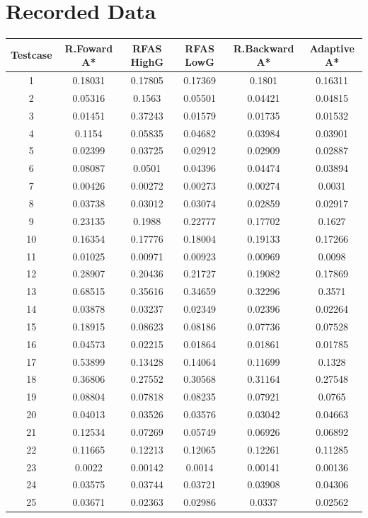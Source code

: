 \documentclass[12pt]{article}
\begin{document}
	\section*{Recorded Data}
		\begin{table}[!htb]
			\centering
			\begin{tabular}{|c|c|c|c|c|c|}
				Testcase & R.Foward A* &  RFAS HighG & RFAS LowG & R.Backward A* & Adaptive A*\\\hline
				1&0.18031&0.17805&0.17369&0.1801&0.16311\\
				2&0.05316&0.1563&0.05501&0.04421&0.04815\\
				3&0.01451&0.37243&0.01579&0.01735&0.01532\\
				4&0.1154&0.05835&0.04682&0.03984&0.03901\\
				5&0.02399&0.03725&0.02912&0.02909&0.02887\\
				6&0.08087&0.0501&0.04396&0.04474&0.03894\\
				7&0.00426&0.00272&0.00273&0.00274&0.0031\\
				8&0.03738&0.03012&0.03074&0.02859&0.02917\\
				9&0.23135&0.1988&0.22777&0.17702&0.1627\\
				10&0.16354&0.17776&0.18004&0.19133&0.17266\\
				11&0.01025&0.00971&0.00923&0.00969&0.0098\\
				12&0.28907&0.20436&0.21727&0.19082&0.17869\\
				13&0.68515&0.35616&0.34659&0.32296&0.3571\\
				14&0.03878&0.03237&0.02349&0.02396&0.02264\\
				15&0.18915&0.08623&0.08186&0.07736&0.07528\\
				16&0.04573&0.02215&0.01864&0.01861&0.01785\\
				17&0.53899&0.13428&0.14064&0.11699&0.1328\\
				18&0.36806&0.27552&0.30568&0.31164&0.27548\\
				19&0.08804&0.07818&0.08235&0.07921&0.0765\\
				20&0.04013&0.03526&0.03576&0.03042&0.04663\\
				21&0.12534&0.07269&0.05749&0.06926&0.06892\\
				22&0.11665&0.12213&0.12065&0.12261&0.11285\\
				23&0.0022&0.00142&0.0014&0.00141&0.00136\\
				24&0.03575&0.03744&0.03721&0.03908&0.04306\\
				25&0.03671&0.02363&0.02986&0.0337&0.02562\\
			\end{tabular}
		\end{table}
\end{document}
